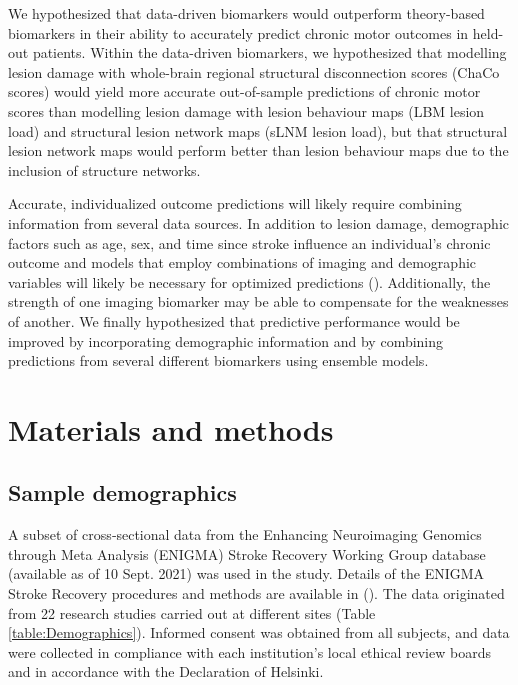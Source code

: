 \documentclass[10pt]{article}
\begin{document}
 We hypothesized that data-driven biomarkers would outperform theory-based biomarkers in their ability to accurately predict chronic motor outcomes in held-out patients. Within the data-driven biomarkers, we hypothesized that modelling lesion damage with whole-brain regional structural disconnection scores (ChaCo scores) would yield more accurate out-of-sample predictions of chronic motor scores than modelling lesion damage with lesion behaviour maps (LBM lesion load) and structural lesion network maps (sLNM lesion load), but that structural lesion network maps would perform better than lesion behaviour maps due to the inclusion of structure networks.

 Accurate, individualized outcome predictions will likely require combining information from several data sources. In addition to lesion damage, demographic factors such as age, sex, and time since stroke influence an individual's chronic outcome and models that employ combinations of imaging and demographic variables will likely be necessary for optimized predictions (\cite{Bonkhoff2022-op}). Additionally, the strength of one imaging biomarker may be able to compensate for the weaknesses of another. We finally hypothesized that predictive performance would be improved by incorporating demographic information and by combining predictions from several different biomarkers using ensemble models.

\section{Materials and methods}
\subsection{Sample demographics}
A subset of cross‐sectional data from the Enhancing Neuroimaging Genomics through Meta Analysis (ENIGMA) Stroke Recovery Working Group database (available as of 10 Sept. 2021) was used in the study. Details of the ENIGMA Stroke Recovery procedures and methods are available in (\cite{Liew2020-ps}). The data originated from 22 research studies carried out at different sites (Table \ref{table:Demographics}). Informed consent was obtained from all subjects, and data were collected in compliance with each institution’s local ethical review boards and in accordance with the Declaration of Helsinki.
\end{document}
